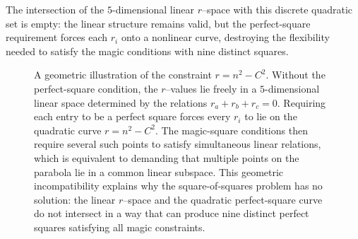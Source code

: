 \documentclass[12pt]{article}
\begin{document}
The intersection of the $5$-dimensional linear $r$--space with this discrete
quadratic set is empty: the linear structure remains valid, but the
perfect-square requirement forces each $r_i$ onto a nonlinear curve, destroying
the flexibility needed to satisfy the magic conditions with nine distinct
squares.
\vspace{1em} %
\begin{figure}[H]
\centering
{}

\caption{A geometric illustration of the constraint $r = n^2 - C^2$.
Without the perfect-square condition, the $r$--values lie freely in a
$5$-dimensional linear space determined by the relations $r_a+r_b+r_c=0$.
Requiring each entry to be a perfect square forces every $r_i$ to lie on the
quadratic curve $r = n^2 - C^2$.  The magic-square conditions then require
several such points to satisfy simultaneous linear relations, which is
equivalent to demanding that multiple points on the parabola lie in a common
linear subspace.  This geometric incompatibility explains why the
square-of-squares problem has no solution: the linear $r$--space and the
quadratic perfect-square curve do not intersect in a way that can produce nine
distinct perfect squares satisfying all magic constraints.}
\label{fig:parabola-rspace}
\end{figure}
\end{document}

